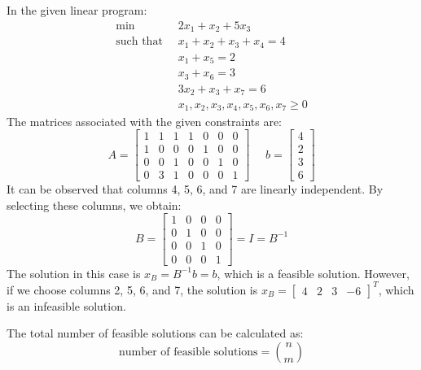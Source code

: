 \begin{example}
    In the given linear program:
    \begin{align*}
        \min                      \:&\: 2x_1+x_2+5x_3          \\
        \text{such that }     &\: x_1+x_2+x_3+x_4=4  \\
                                    &\: x_1+x_5=2  \\
                                    &\: x_3+x_6=3 \\
                                    &\: 3x_2+x_3+x_7=6  \\
                                    &\: x_1,x_2,x_3,x_4,x_5,x_6,x_7 \geq 0
    \end{align*}
    The matrices associated with the given constraints are:
    \[
    A=
    \begin{bmatrix}
        1 & 1 & 1 & 1 & 0 & 0 & 0 \\
        1 & 0 & 0 & 0 & 1 & 0 & 0 \\
        0 & 0 & 1 & 0 & 0 & 1 & 0 \\
        0 & 3 & 1 & 0 & 0 & 0 & 1
    \end{bmatrix}
    \:\:\:\:\:\:
    b=
    \begin{bmatrix}
        4 \\
        2 \\
        3 \\
        6
    \end{bmatrix}
    \]
    It can be observed that columns 4, 5, 6, and 7 are linearly independent. 
    By selecting these columns, we obtain:
    \[
    B= 
    \begin{bmatrix}
        1 & 0 & 0 & 0 \\
        0 & 1 & 0 & 0 \\
        0 & 0 & 1 & 0 \\
        0 & 0 & 0 & 1
    \end{bmatrix}
    =I=B^{-1}
    \]
    The solution in this case is $x_B=B^{-1}b=b$, which is a feasible solution.
    However, if we choose columns 2, 5, 6, and 7, the solution is $x_B=\begin{bmatrix} 4 & 2 & 3 & -6 \end{bmatrix}^T$, which is an infeasible solution.
\end{example}
The total number of feasible solutions can be calculated as:
\[\text{number of feasible solutions}=\binom{n}{m}\]